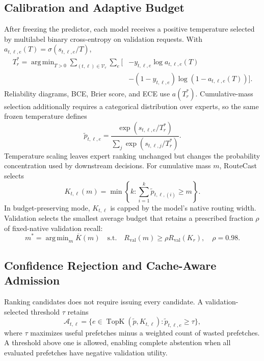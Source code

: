 \documentclass[conference]{IEEEtran}
\DeclareMathOperator*{\argmin}{arg\,min}
\begin{document}
\subsection{Calibration and Adaptive Budget}
After freezing the predictor, each model receives a positive temperature selected by multilabel binary cross-entropy on validation requests. With $a_{t,\ell,e}(T)=\sigma(s_{t,\ell,e}/T)$,
\begin{align}
T_r^*=\argmin_{T>0}\sum_{(t,\ell)\in\mathcal{V}_r}\sum_e
\bigl[&-y_{t,\ell,e}\log a_{t,\ell,e}(T)\nonumber\\
&-(1-y_{t,\ell,e})\log(1-a_{t,\ell,e}(T))\bigr].
\label{eq:temperature-fit}
\end{align}
Reliability diagrams, BCE, Brier score, and ECE use $a(T_r^*)$. Cumulative-mass selection additionally requires a categorical distribution over experts, so the same frozen temperature defines
\begin{equation}
\tilde p_{t,\ell,e}=
\frac{\exp(s_{t,\ell,e}/T_r^*)}
{\sum_j\exp(s_{t,\ell,j}/T_r^*)}.
\label{eq:mass-probability}
\end{equation}
Temperature scaling leaves expert ranking unchanged but changes the probability concentration used by downstream decisions. For cumulative mass $m$, RouteCast selects
\begin{equation}
K_{t,\ell}(m)=\min\left\{k:\sum_{i=1}^{k}
\tilde p_{t,\ell,(i)}\ge m\right\}.
\end{equation}
In budget-preserving mode, $K_{t,\ell}$ is capped by the model's native routing width. Validation selects the smallest average budget that retains a prescribed fraction $\rho$ of fixed-native validation recall:
\begin{equation}
m^*=\argmin_m\overline{K}(m)\quad
\mathrm{s.t.}\quad R_{\mathrm{val}}(m)\ge
\rho R_{\mathrm{val}}(K_r),\quad \rho=0.98.
\label{eq:mass-selection}
\end{equation}

\subsection{Confidence Rejection and Cache-Aware Admission}
Ranking candidates does not require issuing every candidate. A validation-selected threshold $\tau$ retains
\begin{equation}
\mathcal{A}_{t,\ell}=\{e\in\operatorname{TopK}
(\tilde p,K_{t,\ell}):\tilde p_{t,\ell,e}\ge\tau\},
\end{equation}
where $\tau$ maximizes useful prefetches minus a weighted count of wasted prefetches. A threshold above one is allowed, enabling complete abstention when all evaluated prefetches have negative validation utility.
\end{document}
